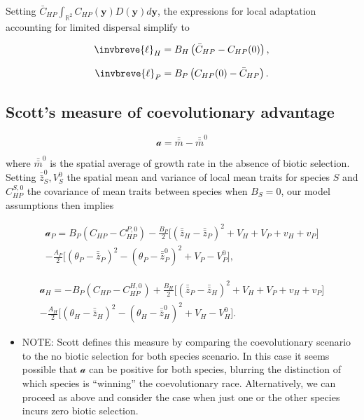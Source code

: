 \documentclass{article}
\begin{document}
Setting \(\bar C_{HP}\int_{\mathbb R^2}C_{HP}(\pmb y)D(\pmb y)d\pmb y\),
the expressions for local adaptation accounting for limited dispersal
simplify to

\[\invbreve{\ell}_H=B_H\left(\bar C_{HP}-C_{HP}(0)\right),\]

\[\invbreve{\ell}_P=B_P\left(C_{HP}(0)-\bar C_{HP}\right).\]

\hypertarget{scotts-measure-of-coevolutionary-advantage}{%
\subsection{Scott's measure of coevolutionary
advantage}\label{scotts-measure-of-coevolutionary-advantage}}

\[\mathcal a=\bar{\bar m}-\bar{\bar m}^0\]

where \(\bar{\bar m}^0\) is the spatial average of growth rate in the
absence of biotic selection. Setting \(\bar{\bar z}_S^0, V_S^0\) the
spatial mean and variance of local mean traits for species \(S\) and
\(C_{HP}^{S,0}\) the covariance of mean traits between species when
\(B_S=0\), our model assumptions then implies

\begin{multline}
  \mathcal a_P=B_P(C_{HP}-C_{HP}^{P,0})-\frac{B_P}{2}\big[(\bar{\bar z}_H-\bar{\bar z}_P)^2+V_H+V_P+v_H+v_P\big] \\
  -\frac{A_P}{2}\big[(\theta_P-\bar{\bar z}_P)^2-(\theta_P-\bar{\bar z}_P^0)^2+V_P-V_P^0\big],
\end{multline}

\begin{multline}
  \mathcal a_H=-B_P(C_{HP}-C_{HP}^{H,0})+\frac{B_H}{2}\big[(\bar{\bar z}_P-\bar{\bar z}_H)^2+V_H+V_P+v_H+v_P\big] \\
  -\frac{A_H}{2}\big[(\theta_H-\bar{\bar z}_H)^2-(\theta_H-\bar{\bar z}_H^0)^2+V_H-V_H^0\big].
\end{multline}

\begin{itemize}
\tightlist
\item
  NOTE: Scott defines this measure by comparing the coevolutionary
  scenario to the no biotic selection for both species scenario. In this
  case it seems possible that \(\mathcal a\) can be positive for both
  species, blurring the distinction of which species is ``winning'' the
  coevolutionary race. Alternatively, we can proceed as above and
  consider the case when just one or the other species incurs zero
  biotic selection.
\end{itemize}
\end{document}
